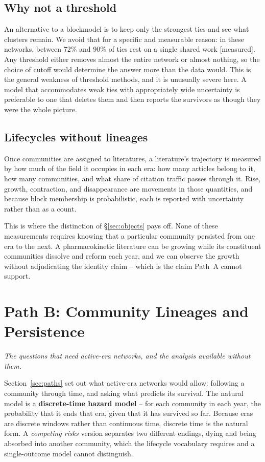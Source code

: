 \documentclass[11pt]{article}
\newcommand{\seccap}[1]{{\slshape\small #1\par}\vspace{0.8em}}
\newcommand{\meas}{{\footnotesize\textsf{[measured]}}}
\begin{document}
\subsection{Why not a threshold}

An alternative to a blockmodel is to keep only the strongest ties and see what clusters
remain. We avoid that for a specific and measurable reason: in these networks, between 72\%
and 90\% of ties rest on a single shared work \meas{}. Any threshold either removes almost
the entire network or almost nothing, so the choice of cutoff would determine the answer more
than the data would. This is the general weakness of threshold methods, and it is unusually
severe here. A model that accommodates weak ties with appropriately wide uncertainty is
preferable to one that deletes them and then reports the survivors as though they were the
whole picture.

\subsection{Lifecycles without lineages}

Once communities are assigned to literatures, a literature's trajectory is measured by how
much of the field it occupies in each era: how many articles belong to it, how many
communities, and what share of citation traffic passes through it. Rise, growth, contraction,
and disappearance are movements in those quantities, and because block membership is
probabilistic, each is reported with uncertainty rather than as a count.

This is where the distinction of \S\ref{sec:objects} pays off. None of these measurements
requires knowing that a particular community persisted from one era to the next. A
pharmacokinetic literature can be growing while its constituent communities dissolve and
reform each year, and we can observe the growth without adjudicating the identity claim --
which is the claim Path~A cannot support.

\section{Path B: Community Lineages and Persistence}
\label{sec:pathb}
\seccap{The questions that need active-era networks, and the analysis available without
them.}

Section~\ref{sec:paths} set out what active-era networks would allow: following a community
through time, and asking what predicts its survival. The natural model is a
\textbf{discrete-time hazard model} -- for each community in each year, the probability that
it ends that era, given that it has survived so far. Because eras are discrete windows
rather than continuous time, discrete time is the natural form. A \emph{competing risks} version separates two different
endings, dying and being absorbed into another community, which the lifecycle vocabulary
requires and a single-outcome model cannot distinguish.
\end{document}
